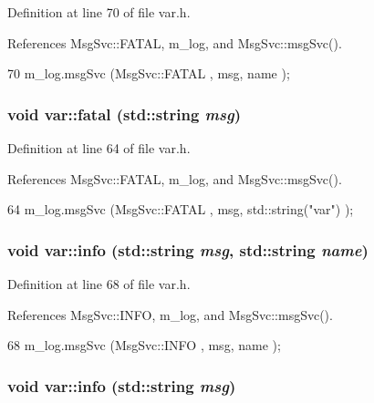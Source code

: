 Definition at line 70 of file var.h.

References MsgSvc::FATAL, m\_\-log, and MsgSvc::msgSvc().


\begin{DoxyCode}
70 { m_log.msgSvc (MsgSvc::FATAL   , msg, name ); }
\end{DoxyCode}
\hypertarget{classvar_a2f23892af2d80d27ebb8032f89d875f2}{
\subsubsection[{fatal}]{\setlength{\rightskip}{0pt plus 5cm}void var::fatal (std::string {\em msg})}}
\label{classvar_a2f23892af2d80d27ebb8032f89d875f2}


Definition at line 64 of file var.h.

References MsgSvc::FATAL, m\_\-log, and MsgSvc::msgSvc().


\begin{DoxyCode}
64 { m_log.msgSvc (MsgSvc::FATAL   , msg, std::string("var") ); }
\end{DoxyCode}
\hypertarget{classvar_a52f41c560b167041c7d4e17a42021d5c}{
\subsubsection[{info}]{\setlength{\rightskip}{0pt plus 5cm}void var::info (std::string {\em msg}, \/  std::string {\em name})}}
\label{classvar_a52f41c560b167041c7d4e17a42021d5c}


Definition at line 68 of file var.h.

References MsgSvc::INFO, m\_\-log, and MsgSvc::msgSvc().


\begin{DoxyCode}
68 { m_log.msgSvc (MsgSvc::INFO    , msg, name ); }
\end{DoxyCode}
\hypertarget{classvar_a6ad63ffe8ea9495201a7b2a824547518}{
\subsubsection[{info}]{\setlength{\rightskip}{0pt plus 5cm}void var::info (std::string {\em msg})}}
\label{classvar_a6ad63ffe8ea9495201a7b2a824547518}



